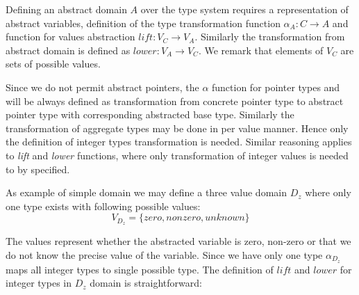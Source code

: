 Defining an abstract domain $A$ over the \LLVM type system requires a representation of
abstract variables, definition of the type transformation function $\alpha_A \colon C \to A$
and function for values abstraction $\textit{lift} \colon V_C \to V_A$.
Similarly the transformation from abstract domain is defined as
$\textit{lower} \colon V_A \to {V_C}$. We remark that elements of $V_C$
are sets of possible values.

%
%

Since we do not permit abstract pointers, the $\alpha$ function for pointer types and will be
always defined as transformation from concrete pointer type to abstract pointer
type with corresponding abstracted base type. Similarly the transformation of
aggregate types may be done in per value manner. Hence only the definition of
integer types transformation is needed. Similar reasoning applies to
\textit{lift} and \textit{lower} functions, where only transformation of integer
values is needed to by specified.

As example of simple domain we may define a three value domain $D_z$ where only
one type exists with following possible values:
\[ V_{D_z} = \{ \textit{zero}, \textit{nonzero}, \textit{unknown} \}\]


The values represent whether the abstracted variable is zero, non-zero or that we do
not know the precise value of the variable. Since we have only one type
$\alpha_{D_z}$ maps all integer types to single possible type.
The definition of $\textit{lift}$ and $\textit{lower}$ for integer
types in $D_z$ domain is straightforward:


